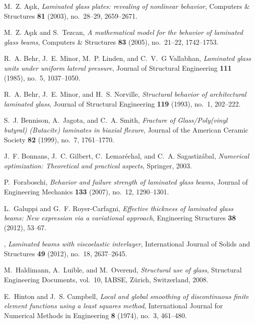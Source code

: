 \documentclass[11pt]{article}
\begin{document}
\begin{thebibliography}{10}

M.~Z. A\c{s}\i{}k, \emph{Laminated glass plates: revealing of nonlinear
  behavior}, Computers \& Structures \textbf{81} (2003), no.~28--29,
  2659--2671.

M.~Z. A\c{s}\i{}k and S.~Tezcan, \emph{A mathematical model for the behavior of
  laminated glass beams}, Computers \& Structures \textbf{83} (2005),
  no.~21--22, 1742--1753.

R.~A. Behr, J.~E. Minor, M.~P. Linden, and C.~V.~G Vallabhan, \emph{Laminated
  glass units under uniform lateral pressure}, Journal of Structural
  Engineering \textbf{111} (1985), no.~5, 1037--1050.

R.~A. Behr, J.~E. Minor, and H.~S. Norville, \emph{Structural behavior of
  architectural laminated glass}, Journal of Structural Engineering
  \textbf{119} (1993), no.~1, 202--222.

S.~J. Bennison, A.~Jagota, and C.~A. Smith, \emph{Fracture of {Glass/Poly(vinyl
  butyral) (Butacite)} laminates in biaxial flexure},
  Journal of the American Ceramic Society \textbf{82} (1999), no.~7,
  1761--1770.

J.~F. Bonnans, J.~C. Gilbert, C.~Lemar\'{e}chal, and C.~A. Sagastiz\'{a}bal,
  \emph{Numerical optimization: {Theoretical} and practical aspects}, Springer,
  2003.

P.~Foraboschi, \emph{Behavior and failure strength of laminated glass beams},
  Journal of Engineering Mechanics \textbf{133} (2007), no.~12, 1290--1301.

L.~Galuppi and G.~F. Royer-Carfagni, \emph{Effective thickness of laminated
  glass beams: {New} expression via a variational approach}, Engineering
  Structures \textbf{38} (2012), 53--67.

\bysame, \emph{Laminated beams with viscoelastic interlayer}, International
  Journal of Solids and Structures \textbf{49} (2012), no.~18, 2637--2645.

M.~Haldimann, A.~Luible, and M.~Overend, \emph{Structural use of glass},
  Structural Engineering Documents, vol.~10, {IABSE}, Z\"{u}rich, Switzerland,
  2008.

E.~Hinton and J.~S. Campbell, \emph{Local and global smoothing of discontinuous
  finite element functions using a least squares method}, International Journal
  for Numerical Methods in Engineering \textbf{8} (1974), no.~3, 461--480.


\end{thebibliography}
\end{document}
